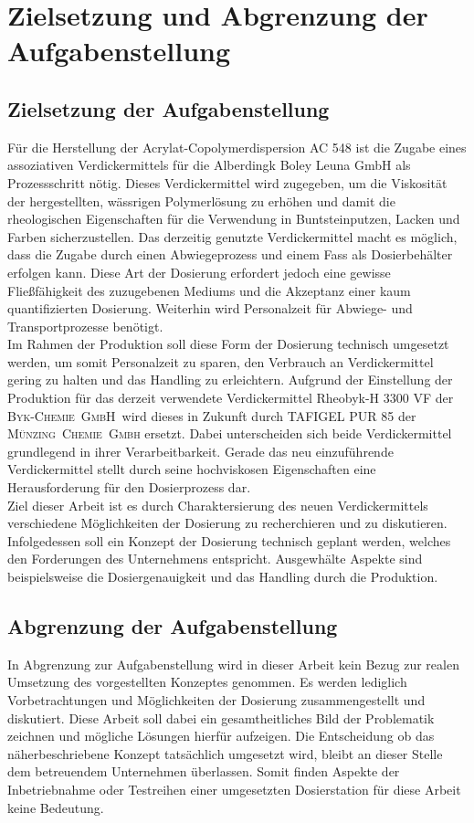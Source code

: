 \section{Zielsetzung und Abgrenzung der Aufgabenstellung}
\label{sec:aufgabenstellung}

\subsection{Zielsetzung der Aufgabenstellung}
Für die Herstellung der Acrylat-Copolymerdispersion AC 548 ist die Zugabe eines assoziativen Verdickermittels für die Alberdingk Boley Leuna GmbH als Prozessschritt nötig. Dieses Verdickermittel wird zugegeben, um die Viskosität der hergestellten, wässrigen Polymerlösung zu erhöhen und damit die rheologischen Eigenschaften für die Verwendung in Buntsteinputzen, Lacken und Farben sicherzustellen. Das derzeitig genutzte Verdickermittel macht es möglich, dass die Zugabe durch einen Abwiegeprozess und einem Fass als Dosierbehälter erfolgen kann. Diese Art der Dosierung erfordert jedoch eine gewisse Fließfähigkeit des zuzugebenen Mediums und die Akzeptanz einer kaum quantifizierten Dosierung. Weiterhin wird Personalzeit für Abwiege- und Transportprozesse benötigt.\\
Im Rahmen der Produktion soll diese Form der Dosierung technisch umgesetzt werden, um somit Personalzeit zu sparen, den Verbrauch an Verdickermittel gering zu halten und das Handling zu erleichtern. Aufgrund der Einstellung der Produktion für das derzeit verwendete Verdickermittel  Rheobyk-H 3300 VF der \mbox{\textsc{Byk-Chemie GmbH} }wird dieses in Zukunft durch TAFIGEL PUR 85 der \mbox{\textsc{Münzing Chemie Gmbh}} ersetzt. Dabei unterscheiden sich beide Verdickermittel grundlegend in ihrer Verarbeitbarkeit. Gerade das neu einzuführende Verdickermittel stellt durch seine hochviskosen Eigenschaften eine Herausforderung für den Dosierprozess dar.\\
Ziel dieser Arbeit ist es durch Charaktersierung des neuen Verdickermittels verschiedene Möglichkeiten der Dosierung zu recherchieren und zu diskutieren. Infolgedessen soll ein Konzept der Dosierung technisch geplant werden, welches den Forderungen des Unternehmens entspricht. Ausgewhälte Aspekte sind beispielsweise die Dosiergenauigkeit und das Handling durch die Produktion.

\subsection{Abgrenzung der Aufgabenstellung}
In Abgrenzung zur Aufgabenstellung wird in dieser Arbeit kein Bezug zur realen Umsetzung des vorgestellten Konzeptes genommen. Es werden lediglich Vorbetrachtungen und Möglichkeiten der Dosierung zusammengestellt und diskutiert. Diese Arbeit soll dabei ein gesamtheitliches Bild der Problematik zeichnen und mögliche Lösungen hierfür aufzeigen. Die Entscheidung ob das näherbeschriebene Konzept tatsächlich umgesetzt wird, bleibt an dieser Stelle dem betreuendem Unternehmen überlassen. Somit finden Aspekte der Inbetriebnahme oder Testreihen einer umgesetzten Dosierstation für diese Arbeit keine Bedeutung.


\pagebreak